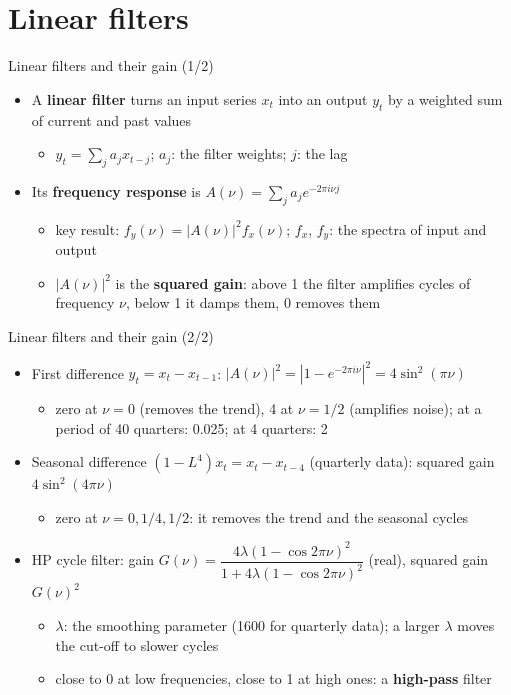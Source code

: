 \section{Linear filters}

\begin{frame}{Linear filters and their gain (1/2)}
\itemsize{\small}
\begin{itemize}
    \item A \textbf{linear filter} turns an input series $x_t$ into an output $y_t$ by a weighted sum of current and past values
    \begin{itemize}
        \item $y_t = \sum_j a_j x_{t-j}$; $a_j$: the filter weights; $j$: the lag
    \end{itemize}
    \item Its \textbf{frequency response} is $A(\nu) = \sum_j a_j e^{-2\pi i\nu j}$
    \begin{itemize}
        \item key result: $f_y(\nu) = |A(\nu)|^2 f_x(\nu)$; $f_x$, $f_y$: the spectra of input and output
        \item $|A(\nu)|^2$ is the \textbf{squared gain}: above 1 the filter amplifies cycles of frequency $\nu$, below 1 it damps them, 0 removes them
    \end{itemize}
\end{itemize}
\end{frame}

\begin{frame}{Linear filters and their gain (2/2)}
\itemsize{\small}
\begin{itemize}
    \item First difference $y_t = x_t - x_{t-1}$: $|A(\nu)|^2 = |1 - e^{-2\pi i\nu}|^2 = 4\sin^2(\pi\nu)$
    \begin{itemize}
        \item zero at $\nu = 0$ (removes the trend), 4 at $\nu = 1/2$ (amplifies noise); at a period of 40 quarters: 0.025; at 4 quarters: 2
    \end{itemize}
    \item Seasonal difference $(1 - L^4)x_t = x_t - x_{t-4}$ (quarterly data): squared gain $4\sin^2(4\pi\nu)$
    \begin{itemize}
        \item zero at $\nu = 0, 1/4, 1/2$: it removes the trend and the seasonal cycles
    \end{itemize}
    \item HP cycle filter: gain $G(\nu) = \dfrac{4\lambda(1 - \cos 2\pi\nu)^2}{1 + 4\lambda(1 - \cos 2\pi\nu)^2}$ (real), squared gain $G(\nu)^2$
    \begin{itemize}
        \item $\lambda$: the smoothing parameter (1600 for quarterly data); a larger $\lambda$ moves the cut-off to slower cycles
        \item close to 0 at low frequencies, close to 1 at high ones: a \textbf{high-pass} filter
    \end{itemize}
\end{itemize}
\end{frame}

